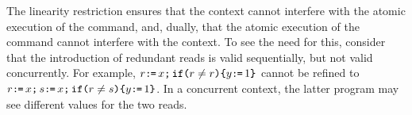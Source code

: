 The linearity restriction ensures that the context cannot interfere with the atomic execution of the command, and, dually, that the atomic execution of the command cannot interfere with the context.   To see the need for this, consider that the introduction of redundant reads is valid sequentially, but not valid concurrently. For example, $r \texttt{:}\mkern-1mu\texttt{=}\, x \texttt{;}\,\allowbreak \texttt{if}\allowbreak\texttt{(}r \neq r\texttt{)}\allowbreak\texttt{\{} y \texttt{:}\mkern-1mu\texttt{=}\, 1 \texttt{\}}$ cannot be refined to $r \texttt{:}\mkern-1mu\texttt{=}\, x \texttt{;}\,\allowbreak s \texttt{:}\mkern-1mu\texttt{=}\, x  \texttt{;}\,\allowbreak  \texttt{if}\allowbreak\texttt{(}r \neq s\texttt{)} \allowbreak\texttt{\{} y \texttt{:}\mkern-1mu\texttt{=}\, 1 \texttt{\}}$.  In a concurrent context, the latter program may see different values for the two reads.







